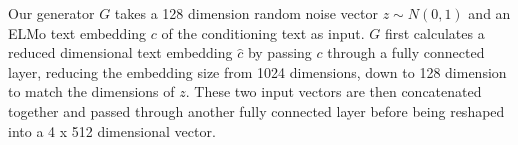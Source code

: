 Our generator $G$ takes a 128 dimension random noise vector $z \sim N(0, 1)$ and an ELMo text embedding $c$ of the conditioning text as input. $G$ first calculates a reduced dimensional text embedding $\hat{c}$ by passing $c$ through a fully connected layer, reducing the embedding size from 1024 dimensions, down to 128 dimension to match the dimensions of $z$. These two input vectors are then concatenated together and passed through another fully connected layer before being reshaped into a 4 x 512 dimensional vector.